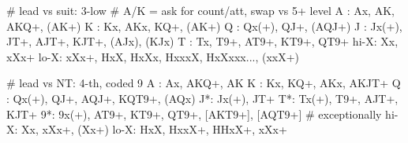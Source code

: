 # lead vs suit: 3-low
# A/K = ask for count/att, swap vs 5+ level
A : Ax, AK, AKQ+, (AK+)
K : Kx, AKx, KQ+, (AK+)
Q : Qx(+), QJ+, (AQJ+)
J : Jx(+), JT+, AJT+, KJT+, (AJx), (KJx)
T : Tx, T9+, AT9+, KT9+, QT9+
hi-X: Xx, xXx+
lo-X: xXx+, HxX, HxXx, HxxxX, HxXxxx..., (xxX+)

# lead vs NT: 4-th, coded 9
A : Ax, AKQ+, AK
K : Kx, KQ+, AKx, AKJT+
Q : Qx(+), QJ+, AQJ+, KQT9+, (AQx)
J*: Jx(+), JT+
T*: Tx(+), T9+, AJT+, KJT+
9*: 9x(+), AT9+, KT9+, QT9+, [AKT9+], [AQT9+]  # exceptionally
hi-X: Xx, xXx+, (Xx+)
lo-X: HxX, HxxX+, HHxX+, xXx+
